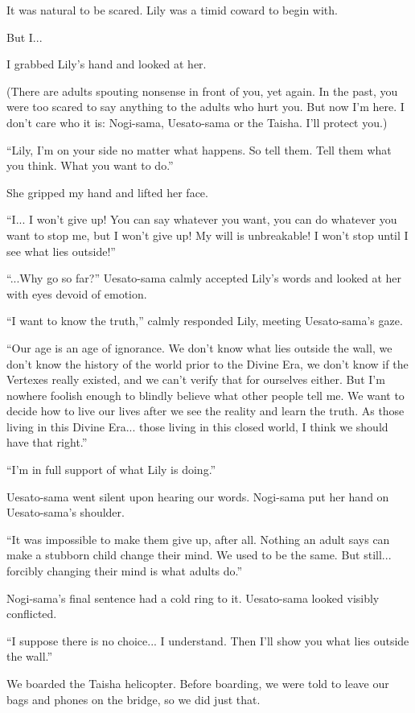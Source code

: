 It was natural to be scared. Lily was a timid coward to begin with.

But I...

I grabbed Lily's hand and looked at her.

(There are adults spouting nonsense in front of you, yet again. In the past, you were too scared to say anything to the adults who hurt you. But now I'm here. I don't care who it is: Nogi-sama, Uesato-sama or the Taisha. I'll protect you.)

``Lily, I'm on your side no matter what happens. So tell them. Tell them what you think. What you want to do.''

She gripped my hand and lifted her face.

``I... I won't give up! You can say whatever you want, you can do whatever you want to stop me, but I won't give up! My will is unbreakable! I won't stop until I see what lies outside!''

``...Why go so far?'' Uesato-sama calmly accepted Lily's words and looked at her with eyes devoid of emotion.

``I want to know the truth,'' calmly responded Lily, meeting Uesato-sama's gaze.

``Our age is an age of ignorance. We don't know what lies outside the wall, we don't know the history of the world prior to the Divine Era, we don't know if the Vertexes really existed, and we can't verify that for ourselves either. But I'm nowhere foolish enough to blindly believe what other people tell me. We want to decide how to live our lives after we see the reality and learn the truth. As those living in this Divine Era... those living in this closed world, I think we should have that right.''

``I'm in full support of what Lily is doing.''

Uesato-sama went silent upon hearing our words. Nogi-sama put her hand on Uesato-sama's shoulder.

``It was impossible to make them give up, after all. Nothing an adult says can make a stubborn child change their mind. We used to be the same. But still... forcibly changing their mind is what adults do.''

Nogi-sama's final sentence had a cold ring to it. Uesato-sama looked visibly conflicted.

``I suppose there is no choice... I understand. Then I'll show you what lies outside the wall.''

We boarded the Taisha helicopter. Before boarding, we were told to leave our bags and phones on the bridge, so we did just that.

